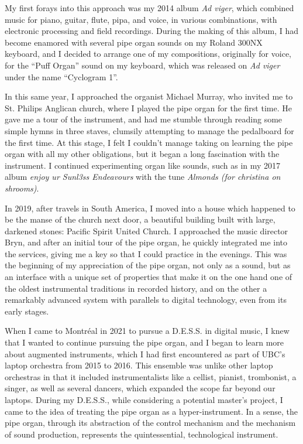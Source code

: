 \documentclass[12pt,twoside,maitrise]{dms_ks}
\theoremstyle{definition}
\begin{document}
My first forays into this approach was my 2014 album \textit{Ad viger}, which combined music for piano, guitar, flute, pipa, and voice, in various combinations, with electronic processing and field recordings. 
During the making of this album, I had become enamored with several pipe organ sounds on my Roland 300NX keyboard, and I decided to arrange one of my compositions, originally for voice, for the “Puff Organ” sound on my keyboard, which was released on \textit{Ad viger} under the name “Cyclogram 1”.

In this same year, I approached the organist Michael Murray, who invited me to St. 
Philips Anglican church, where I played the pipe organ for the first time. 
He gave me a tour of the instrument, and had me stumble through reading some simple hymns in three staves, clumsily attempting to manage the pedalboard for the first time. 
At this stage, I felt I couldn't manage taking on learning the pipe organ with all my other obligations, but it began a long fascination with the instrument. 
I continued experimenting organ like sounds, such as in my 2017 album \textit{enjoy ur Sunl3ss Endeavours} with the tune \textit{Almonds (for christina on shrooms)}. 

In 2019, after travels in South America, I moved into a house which happened to be the manse of the church next door, a beautiful building built with large, darkened stones: Pacific Spirit United Church. 
I approached the music director Bryn, and after an initial tour of the pipe organ, he quickly integrated me into the services, giving me a key so that I could practice in the evenings. 
This was the beginning of my appreciation of the pipe organ, not only as a sound, but as an interface with a unique set of properties that make it on the one hand one of the oldest instrumental traditions in recorded history, and on the other a remarkably advanced system with parallels to digital technology, even from its early stages.

When I came to Montréal in 2021 to pursue a D.E.S.S. in digital music, I knew that I wanted to continue pursuing the pipe organ, and I began to learn more about augmented instruments, which I had first encountered as part of UBC's laptop orchestra from 2015 to 2016. 
This ensemble was unlike other laptop orchestras in that it included instrumentalists like a cellist, pianist, trombonist, a singer, as well as several dancers, which expanded the scope far beyond our laptops. 
During my D.E.S.S., while considering a potential master's project, I came to the idea of treating the pipe organ as a hyper-instrument. 
In a sense, the pipe organ, through its abstraction of the control mechanism and the mechanism of sound production, represents the quintessential, technological instrument.
 
\end{document}
